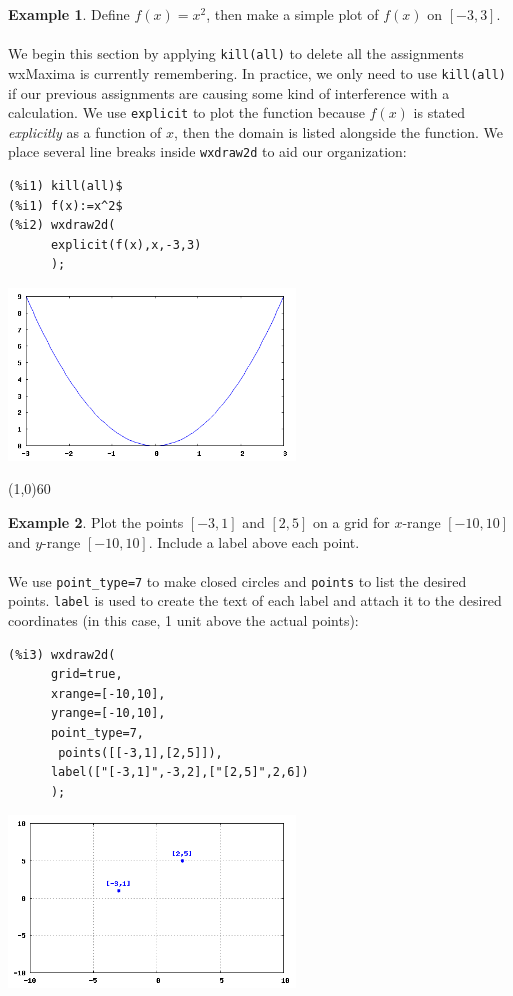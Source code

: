 \documentclass[10.5pt,twoside]{report}
\theoremstyle{definition}
\newtheorem{exmp}{Example}[section]
\begin{document}
\begin{exmp} Define $f(x)=x^2$, then make a simple plot of $f(x)$ on $[-3,3]$.\\
${}$\\

We begin this section by applying \verb|kill(all)| to delete all the assignments wxMaxima is currently remembering.  In practice, we only need to use \verb|kill(all)| if our previous assignments are causing some kind of interference with a calculation.  We use \verb|explicit| to plot the function because $f(x)$ is stated \textit{explicitly} as a function of $x$, then the domain is listed alongside the function.  We place several line breaks inside \verb|wxdraw2d| to aid our organization:

\begin{verbatim}
(%i1) kill(all)$
(%i1) f(x):=x^2$
(%i2) wxdraw2d(
      explicit(f(x),x,-3,3)
      );
\end{verbatim}

\includegraphics[width=3in]{example_0_3_1_1}

\end{exmp}

\line(1,0){60}
\linethickness{0.5mm}


\begin{exmp} Plot the points $[-3,1]$ and $[2,5]$ on a grid for $x$-range $[-10,10]$ and $y$-range $[-10,10]$. Include a label above each point.\\
${}$\\

We use \verb|point_type=7| to make closed circles and \verb|points| to list the desired points.  \verb|label| is used to create the text of each label and attach it to the desired coordinates (in this case, 1 unit above the actual points):

\begin{verbatim}
(%i3) wxdraw2d(
      grid=true,
      xrange=[-10,10],
      yrange=[-10,10],
      point_type=7,
       points([[-3,1],[2,5]]),
      label(["[-3,1]",-3,2],["[2,5]",2,6])
      );
\end{verbatim}

\includegraphics[width=3in]{example_0_3_2_1}

\end{exmp}
\end{document}
